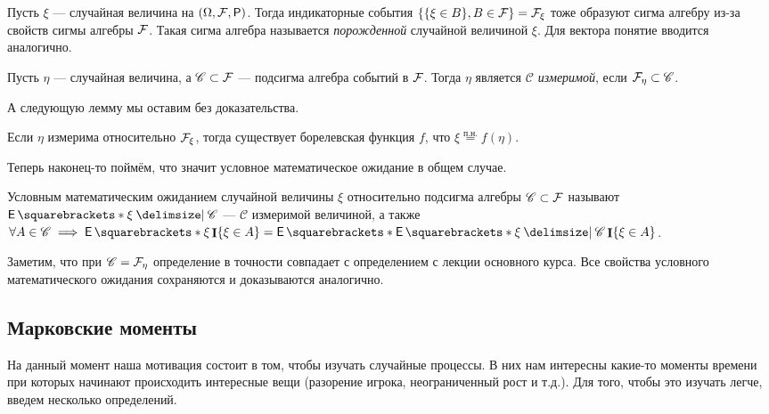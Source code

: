 \begin{definition}
  Пусть $\xi$ --- случайная величина на $(\Omega, \F, \Pr)$. Тогда индикаторные события
  $\{\{\xi \in B\}, B \in \mathcal{F}\} = \mathcal{F}_\xi$ тоже образуют сигма алгебру из-за свойств
  сигмы алгебры $\mathcal{F}$. Такая сигма алгебра называется \textit{порожденной}
  случайной величиной
  $\xi$. Для вектора понятие вводится аналогично.
\end{definition}

\begin{definition}
  Пусть $\eta$ --- случайная величина, а $\mathscr{C} \subset \mathcal{F}$ --- подсигма
  алгебра событий в $\mathcal{F}$. Тогда $\eta$ является \textit{$\mathscr{C}$ измеримой},
  если $\mathcal{F}_\eta \subset \mathscr{C}$.
\end{definition}

А следующую лемму мы оставим без доказательства.

\begin{lemma}
  Если $\eta$ измерима относительно $\mathcal{F}_\xi$, тогда существует борелевская
  функция $f$, что $\xi \overset{\text{п.н.}}{=} f(\eta)$.
\end{lemma}

Теперь наконец-то поймём, что значит условное математическое ожидание в
общем случае.

\begin{definition}
  Условным математическим ожиданием случайной величины $\xi$ относительно
  подсигма алгебры $\mathscr{C} \subset \mathcal{F}$ называют $\E{\xi \given \mathscr{C}}$ ---
  $\mathscr{C}$ измеримой величиной, а также $\forall A \in \mathscr{C} \implies
  \E{\xi\I\{\xi \in A\}} = \E{\E{\xi \given \mathscr{C}} \I\{\xi \in A\}}$.
\end{definition}

Заметим, что при $\mathscr{C} = \mathcal{F}_\eta$ определение в точности совпадает с определением
с лекции основного курса. Все свойства условного математического ожидания сохраняются и доказываются
аналогично.

\subsection{Марковские моменты}

На данный момент наша мотивация состоит в том, чтобы изучать случайные процессы.
В них нам интересны какие-то моменты времени при которых начинают
происходить интересные вещи (разорение игрока, неограниченный рост и т.д.). Для
того, чтобы это изучать легче, введем несколько определений.


